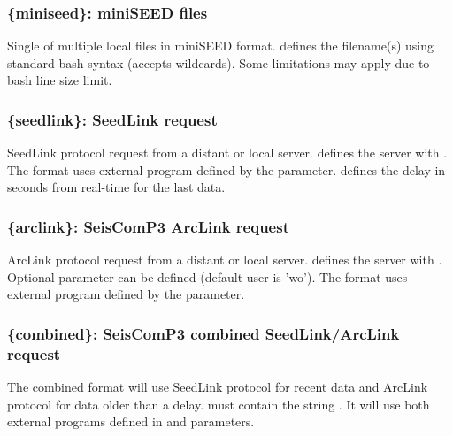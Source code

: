 \subsubsection{\{miniseed\}: miniSEED files}
\label{miniseed}

Single of multiple local files in miniSEED format.  defines the filename(s) using standard bash syntax (accepts wildcards). Some limitations may apply due to bash line size limit.


\subsubsection{\{seedlink\}: SeedLink request}
\label{seedlink}

SeedLink protocol request from a distant or local server.  defines the server with . The format uses external program  defined by the   parameter.  defines the delay in seconds from real-time for the last data.


\subsubsection{\{arclink\}: SeisComP3 ArcLink request}
\label{arclink}

ArcLink protocol request from a distant or local server.  defines the server with . Optional parameter  can be defined (default user is 'wo'). The format uses external program  defined by the   parameter.

\subsubsection{\{combined\}: SeisComP3 combined SeedLink/ArcLink request}

The combined format will use SeedLink protocol for recent data and ArcLink protocol for data older than a delay.  must contain the string . It will use both external programs defined in   and  parameters.

